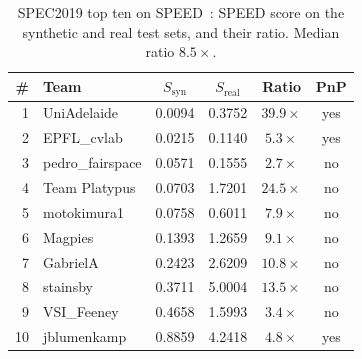 \begin{table}[ht]
  \caption{SPEC2019 top ten on SPEED~\citep{kisantal2020speed}: SPEED score on the synthetic and real test sets, and their ratio. Median ratio $8.5\times$.}
  \label{tab:spec2019}
  \centering
  \small
  \begin{tabular}{rl cc c c}
    \toprule
    \# & Team & $S_\mathrm{syn}$ & $S_\mathrm{real}$ & Ratio & PnP \\
    \midrule
    1 & UniAdelaide & 0.0094 & 0.3752 & $39.9\times$ & yes \\
    2 & EPFL\_cvlab & 0.0215 & 0.1140 & $5.3\times$ & yes \\
    3 & pedro\_fairspace & 0.0571 & 0.1555 & $2.7\times$ & no \\
    4 & Team Platypus & 0.0703 & 1.7201 & $24.5\times$ & no \\
    5 & motokimura1 & 0.0758 & 0.6011 & $7.9\times$ & no \\
    6 & Magpies & 0.1393 & 1.2659 & $9.1\times$ & no \\
    7 & GabrielA & 0.2423 & 2.6209 & $10.8\times$ & no \\
    8 & stainsby & 0.3711 & 5.0004 & $13.5\times$ & no \\
    9 & VSI\_Feeney & 0.4658 & 1.5993 & $3.4\times$ & no \\
    10 & jblumenkamp & 0.8859 & 4.2418 & $4.8\times$ & yes \\
    \bottomrule
  \end{tabular}
\end{table}
